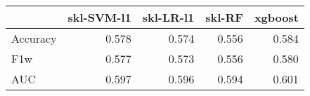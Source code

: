\begin{tabular}{lrrrr}
\toprule
{} &  skl-SVM-l1 &  skl-LR-l1 &  skl-RF &  xgboost \\
\midrule
Accuracy &       0.578 &      0.574 &   0.556 &    0.584 \\
F1w      &       0.577 &      0.573 &   0.556 &    0.580 \\
AUC      &       0.597 &      0.596 &   0.594 &    0.601 \\
\bottomrule
\end{tabular}

